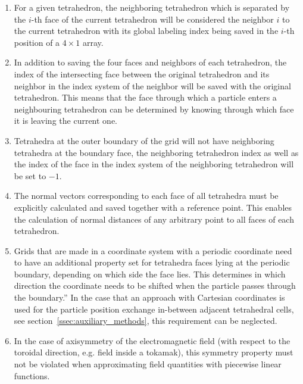 \documentclass{TheMartianReport}
\begin{document}
\begin{enumerate}
	\item For a given tetrahedron, the neighboring tetrahedron which is separated by the $i$-th face of the current tetrahedron will be considered the neighbor $i$ to the current tetrahedron with its global labeling index being saved in the $i$-th position of a $4\times1$ array.
	
	\item In addition to saving the four faces and neighbors of each tetrahedron, the index of the intersecting face between the original tetrahedron and its neighbor in the index system of the neighbor will be saved with the original tetrahedron. This means that the face through which a particle enters a neighbouring tetrahedron can be determined by knowing through which face it is leaving the current one.
	
	\item Tetrahedra at the outer boundary of the grid will not have neighboring tetrahedra at the boundary face, the neighboring tetrahedron index as well as the index of the face in the index system of the neighboring tetrahedron will be set to $-1$.
	
	\item The normal vectors corresponding to each face of all tetrahedra must be explicitly calculated and saved together with a reference point. This enables the calculation of normal distances of any arbitrary point to all faces of each tetrahedron.
	
	\item Grids that are made in a coordinate system with a periodic coordinate need to have an additional property set for tetrahedra faces lying at the periodic boundary, depending on which side the face lies. This determines in which direction the coordinate needs to be shifted when the particle passes through the boundary.''\cite{bauer_master_2020} In the case that an approach with Cartesian coordinates is used for the particle position exchange in-between adjacent tetrahedral cells, see section~\ref{ssec:auxiliary_methods}, this requirement can be neglected.
	
	\item In the case of axisymmetry of the electromagnetic field (with respect to the toroidal direction, e.g. field inside a tokamak),  this symmetry property must not be violated when approximating field quantities with piecewise linear functions.\\
\end{enumerate}
\end{document}
